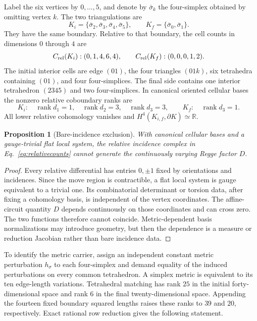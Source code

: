 \documentclass[11pt]{article}
\newtheorem{proposition}[theorem]{Proposition}
\theoremstyle{definition}
\theoremstyle{remark}
\newcommand{\rank}{\operatorname{rank}}
\begin{document}
Label the six vertices by $0,\ldots,5$, and denote by $\bar\sigma_k$ the four-simplex obtained by omitting vertex $k$.  The two triangulations are
\begin{equation}
 K_i=\{\bar\sigma_2,\bar\sigma_3,\bar\sigma_4,\bar\sigma_5\},
 \qquad K_f=\{\bar\sigma_0,\bar\sigma_1\}.
 \label{eq:complexes}
\end{equation}
They have the same boundary.  Relative to that boundary, the cell counts in dimensions $0$ through $4$ are
\begin{equation}
 C_{\rm rel}(K_i):(0,1,4,6,4),\qquad
 C_{\rm rel}(K_f):(0,0,0,1,2).
 \label{eq:relativecounts}
\end{equation}
The initial interior cells are edge $(01)$, the four triangles $(01k)$, six tetrahedra containing $(01)$, and four four-simplices.  The final side contains one interior tetrahedron $(2345)$ and two four-simplices.  In canonical oriented cellular bases the nonzero relative coboundary ranks are
\begin{equation}
 K_i:\quad \rank d_1=1,\quad\rank d_2=3,\quad\rank d_3=3,
 \qquad
 K_f:\quad\rank d_3=1.
 \label{eq:incidenceranks}
\end{equation}
All lower relative cohomology vanishes and $H^4(K_{i,f},\partial K)\simeq\mathbb R$.

\begin{proposition}[Bare-incidence exclusion]
With canonical cellular bases and a gauge-trivial flat local system, the relative incidence complex in Eq.~\eqref{eq:relativecounts} cannot generate the continuously varying Regge factor $D$.
\end{proposition}
\begin{proof}
Every relative differential has entries $0,\pm1$ fixed by orientations and incidences.  Since the move region is contractible, a flat local system is gauge equivalent to a trivial one.  Its combinatorial determinant or torsion data, after fixing a cohomology basis, is independent of the vertex coordinates.  The affine-circuit quantity $D$ depends continuously on those coordinates and can cross zero.  The two functions therefore cannot coincide.  Metric-dependent basis normalizations may introduce geometry, but then the dependence is a measure or reduction Jacobian rather than bare incidence data.
\end{proof}

To identify the metric carrier, assign an independent constant metric perturbation $h_\sigma$ to each four-simplex and demand equality of the induced perturbations on every common tetrahedron.  A simplex metric is equivalent to its ten edge-length variations.  Tetrahedral matching has rank $25$ in the initial forty-dimensional space and rank $6$ in the final twenty-dimensional space.  Appending the fourteen fixed boundary squared lengths raises these ranks to $39$ and $20$, respectively.  Exact rational row reduction gives the following statement.
\end{document}
